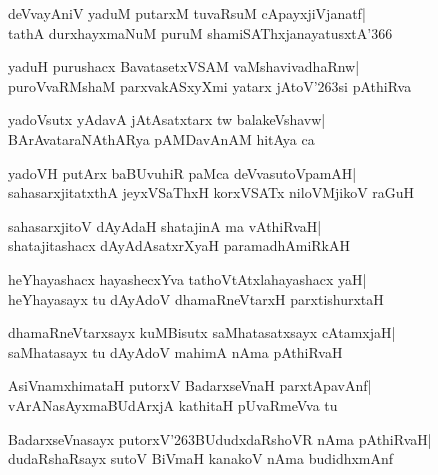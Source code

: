 \documentclass[twoside,12pt,openright]{book}
\def\S{\char'263}
\newcounter{shloka}[chapter]
\begin{document}
\begin{shloka}%
deVvayAniV yaduM putarxM tuvaRsuM cApayxjiVjanatf|\\
tathA durxhayxmaNuM puruM shamiSAThxjanayatusxtA\char'366
\end{shloka}

\begin{shloka}%
yaduH purushacx BavatasetxVSAM vaMshavivadhaRnw|\\
puroVvaRMshaM parxvakASxyXmi yatarx jAtoV\S si pAthiRva
\end{shloka}

\begin{shloka}%
yadoVsutx yAdavA jAtAsatxtarx tw balakeVshavw|\\
BArAvataraNAthARya pAMDavAnAM hitAya ca 
\end{shloka}

\begin{shloka}%
yadoVH putArx baBUvuhiR paMca deVvasutoVpamAH|\\
sahasarxjitatxthA jeyxVSaThxH korxVSATx niloVMjikoV raGuH
\end{shloka}

\begin{shloka}%
sahasarxjitoV dAyAdaH shatajinA ma vAthiRvaH|\\
shatajitashacx dAyAdAsatxrXyaH paramadhAmiRkAH
\end{shloka}

\begin{shloka}%
heYhayashacx hayashecxYva tathoVtAtxlahayashacx yaH|\\
heYhayasayx tu dAyAdoV dhamaRneVtarxH parxtishurxtaH
\end{shloka}

\begin{shloka}%
dhamaRneVtarxsayx kuMBisutx saMhatasatxsayx cAtamxjaH|\\
saMhatasayx tu dAyAdoV mahimA nAma pAthiRvaH
\end{shloka}

\begin{shloka}%
AsiVnamxhimataH putorxV BadarxseVnaH parxtApavAnf|\\
vArANasAyxmaBUdArxjA kathitaH pUvaRmeVva tu
\end{shloka}

\begin{shloka}%
BadarxseVnasayx putorxV\S BUdudxdaRshoVR nAma pAthiRvaH|\\
dudaRshaRsayx sutoV BiVmaH kanakoV nAma budidhxmAnf
\end{shloka}
\end{document}
